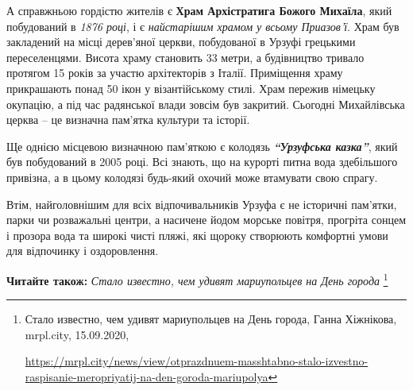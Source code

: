 А справжньою гордістю жителів є \textbf{Храм Архістратига Божого Михаїла}, який
побудований в \emph{1876 році}, і є \emph{найстарішим храмом у всьому Приазов'ї}. Храм був
закладений на місці дерев'яної церкви, побудованої в Урзуфі грецькими
переселенцями. Висота храму становить 33 метри, а будівництво тривало протягом
15 років за участю архітекторів з Італії. Приміщення храму прикрашають понад 50
ікон у візантійському стилі. Храм пережив німецьку окупацію, а під час
радянської влади зовсім був закритий. Сьогодні Михайлівська церква – це
визначна пам'ятка культури та історії.

Ще однією місцевою визначною пам'яткою є колодязь \textbf{\emph{\enquote{Урзуфська казка}}}, який був
побудований в 2005 році. Всі знають, що на курорті питна вода здебільшого
привізна, а в цьому колодязі будь-який охочий може втамувати свою спрагу.

Втім, найголовнішим для всіх відпочивальників Урзуфа є не історичні пам'ятки,
парки чи розважальні центри, а насичене йодом морське повітря, прогріта сонцем
і прозора вода та широкі чисті пляжі, які щороку створюють комфортні умови для
відпочинку і оздоровлення.

\textbf{Читайте також:} \emph{Стало известно, чем удивят мариупольцев на День города}%
\footnote{Стало известно, чем удивят мариупольцев на День города, Ганна Хіжнікова, mrpl.city, 15.09.2020, \par%
\url{https://mrpl.city/news/view/otprazdnuem-masshtabno-stalo-izvestno-raspisanie-meropriyatij-na-den-goroda-mariupolya}
}
